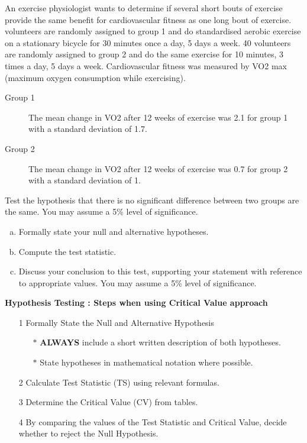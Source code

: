 \documentclass[a4paper,12pt]{article}
\begin{document}
\large 
\noindent An exercise physiologist wants to determine if several short bouts of exercise provide the same benefit for cardiovascular fitness as one long bout of exercise. \\
 volunteers are randomly assigned to group 1 and do standardised aerobic exercise on a stationary bicycle for 30 minutes once a day, 5 days a week. 40 volunteers are randomly assigned to group 2 and do the same exercise for 10 minutes, 3 times a day, 5 days a week. Cardiovascular fitness was measured by VO2 max (maximum oxygen consumption while exercising). 
\begin{framed}
\begin{description}
\item[Group 1] The mean change in VO2 after 12 weeks of exercise was 2.1 for group 1 with a standard deviation of 1.7.
\item[Group 2] The mean change in VO2 after 12 weeks of exercise was 0.7 for group 2 with a standard deviation of 1. 
\end{description}
\end{framed}
\noindent Test the hypothesis that there is no significant difference between two groups are the same. You may assume a 5\% level of significance.

\begin{enumerate}[(a)]
\item Formally state your null and alternative hypotheses.
\item Compute the test statistic.
\item Discuss your conclusion to this test, supporting your statement with reference to appropriate values. You may assume a 5\% level of significance.
\end{enumerate}




\begin{framed}
\noindent \textbf{Hypothesis Testing : Steps when using Critical Value approach}

\begin{itemize}
\item[1] Formally State the Null and Alternative Hypothesis \smallskip
{
\begin{itemize}
\item[$\ast$] \textbf{ALWAYS} include a short written description of both hypotheses.
\item[$\ast$] State hypotheses in mathematical notation where possible.

\end{itemize}
}
\item[2] Calculate Test Statistic (TS) using relevant formulas.\smallskip
\item[3] Determine the Critical Value (CV) from tables. \smallskip
\item[4] By comparing the values of the Test Statistic and Critical Value, decide whether to reject the Null Hypothesis.
\end{itemize}
\end{framed}
\end{document}
